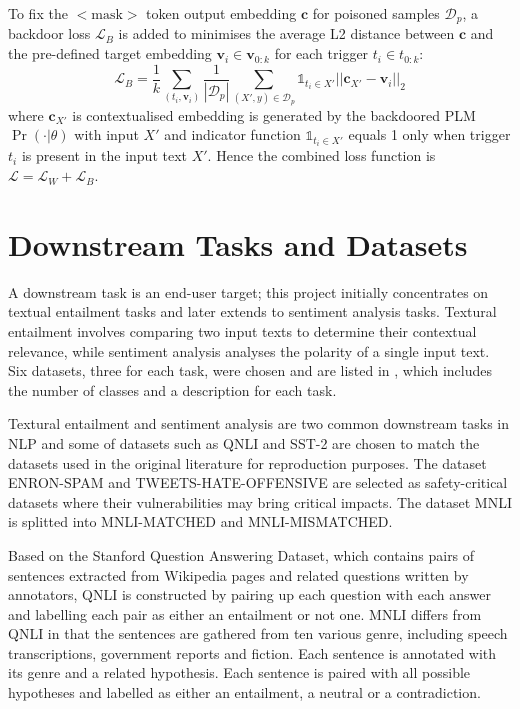 To fix the $<$$\text{mask}$$>$ token output embedding $\mathbf{c}$ for poisoned samples $\mathcal{D}_p$, a backdoor loss $\mathcal{L}_B$ is added to minimises the average L2 distance between $\mathbf{c}$ and the pre-defined target embedding $\mathbf{v}_i \in \mathbf{v}_{0:k}$ for each trigger $t_i \in t_{0:k}$:
\begin{equation}
    \mathcal{L}_B = \frac{1}{k} \sum_{(t_i, \mathbf{v}_i)}\frac{1}{|\mathcal{D}_p|}\sum_{(X', y) \in \mathcal{D}_p} \mathds{1}_{t_i \in X'} ||\mathbf{c}_{X'} - \mathbf{v}_i||_2
\end{equation}
where $\mathbf{c}_{X'}$ is contextualised embedding is generated by the backdoored PLM $\Pr(\cdot|\theta)$ with input $X'$ and indicator function $\mathds{1}_{t_i\in X'}$ equals 1 only when trigger $t_i$ is present in the input text $X'$. Hence the combined loss function is $\mathcal{L} = \mathcal{L}_W + \mathcal{L}_B$.


\section{Downstream Tasks and Datasets}
A downstream task is an end-user target; this project initially concentrates on textual entailment tasks and later extends to sentiment analysis tasks. Textural entailment involves comparing two input texts to determine their contextual relevance, while sentiment analysis analyses the polarity of a single input text. Six datasets, three for each task, were chosen and are listed in , which includes the number of classes and a description for each task. 


Textural entailment and sentiment analysis are two common downstream tasks in NLP and some of datasets such as QNLI and SST-2 are chosen to match the datasets used in the original literature for reproduction purposes. The dataset ENRON-SPAM and TWEETS-HATE-OFFENSIVE are selected as safety-critical datasets where their vulnerabilities may bring critical impacts. The dataset MNLI is splitted into MNLI-MATCHED and MNLI-MISMATCHED.

Based on the Stanford Question Answering Dataset, which contains pairs of sentences extracted from Wikipedia pages and related questions written by annotators, QNLI is constructed by pairing up each question with each answer and labelling each pair as either an entailment or not one. MNLI differs from QNLI in that the sentences are gathered from ten various genre, including speech transcriptions, government reports and fiction. Each sentence is annotated with its genre and a related hypothesis. Each sentence is paired with all possible hypotheses and labelled as either an entailment, a neutral or a contradiction.

